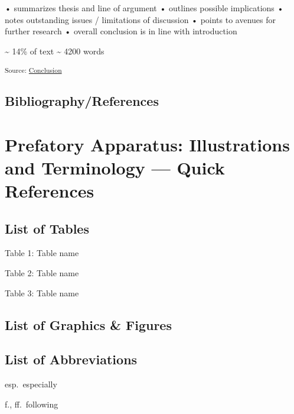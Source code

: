 \documentclass[12pt,a4paper]{report}      %
\begin{document}
• summarizes thesis and line of argument • outlines possible
implications • notes outstanding issues / limitations of discussion •
points to avenues for further research • overall conclusion is in line
with introduction

\textasciitilde{} 14\% of text \textasciitilde{} 4200 words

\textsubscript{Source:
\href{https://VJMeyer.github.io/submission/chapters/Conclusion.qmd.html\#cf16ed96-aa1a-4d5f-a93d-d5f1b524cf26}{Conclusion}}

\section*{Bibliography/References}\label{bibliographyreferences}

\label{refs}

\chapter*{Prefatory Apparatus: Illustrations and Terminology --- Quick
References}\label{prefatory-apparatus-illustrations-and-terminology-quick-references}

\section*{List of Tables}\label{list-of-tables}

Table 1: Table name

Table 2: Table name

Table 3: Table name

\section*{List of Graphics \& Figures}\label{list-of-graphics-figures}

\section*{List of Abbreviations}\label{list-of-abbreviations}

esp.~especially

f., ff.~following
\end{document}
